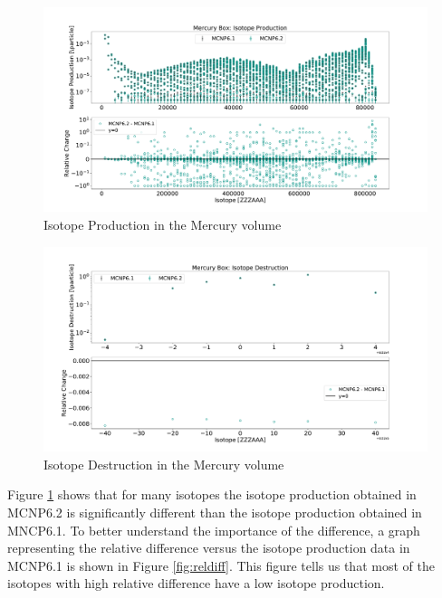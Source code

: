\begin{figure}[h!]
        \centering
        \includegraphics[scale=0.35]{figs/prod_merbox_62_61.pdf}
	\caption{Isotope Production in the Mercury volume}
        \label{fig:prod}
\end{figure}

\begin{figure}[ht]
        \centering
        \includegraphics[scale=0.35]{figs/dest_merbox_62_61.pdf}
	\caption{Isotope Destruction in the Mercury volume}
        \label{fig:dest}
\end{figure}

Figure \ref{fig:prod} shows that for many isotopes the isotope 
production obtained in MCNP6.2 is significantly different than the
isotope production obtained in MNCP6.1. 
To better understand the importance of
the difference, a graph representing the relative difference versus the
isotope production data in MCNP6.1 is shown in Figure \ref{fig:reldiff}. This 
figure tells us that most of the isotopes with high relative difference
have a low isotope production.

